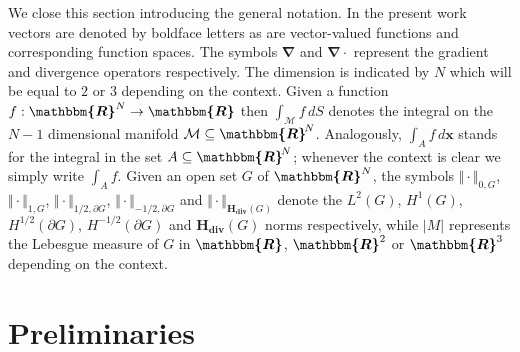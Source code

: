 \documentclass[3p]{elsarticle}
\def\x{\mathbf x}
\def\div{\bm{\nabla} \cdot}
\def\grad{\bm{\nabla}}
\def\R{\bm{\mathbbm{R} } }
\def\Hdiv{\mathbf{H_{div}}}
\def\outer{\bm {\widehat{\nu} } }
\begin{document}
We close this section introducing the general notation. In the present work vectors are denoted by boldface letters as are vector-valued functions and corresponding function spaces. The symbols $\grad$ and $\div$ represent the gradient and divergence operators respectively. The dimension is indicated by $N$ which will be equal to $2$ or $3$ depending on the context. Given a function $f: \R^{N}\rightarrow \R$ then  $\int_{\mathcal {M} } f\,dS$ denotes the integral on the $N-1$ dimensional manifold $\mathcal{M}\subseteq \R^{\! N}$. Analogously, $\int_{A} f\, d\x$ stands for the integral in the set $A\subseteq \R^{\! N}$; whenever the context is clear we simply write $\int_{A} f$. 
Given an open set $G$ of $\R^{N}$, the symbols $\Vert\cdot\Vert_{0,G}$, $\Vert\cdot\Vert_{1,G}$, $\Vert\cdot\Vert_{1/2, \partial G}$, $\Vert\cdot\Vert_{-1/2, \partial G}$ and $\Vert\cdot\Vert_{\Hdiv(G)}$ denote the $L^{2}(G)$, $H^{1}(G)$, $H^{1/2} (\partial G)$, $H^{-1/2} (\partial G)$ and $\Hdiv(G)$ norms respectively, while $\vert M\vert$ represents the Lebesgue measure of $G$ in $\R$, $\R^{2}$ or $\R^{3}$ depending on the context.
%
%
%
%
%
%
%
%
%
%
%
%
%
\section{Preliminaries}   %
%
%
%
%
%
%
\end{document}
